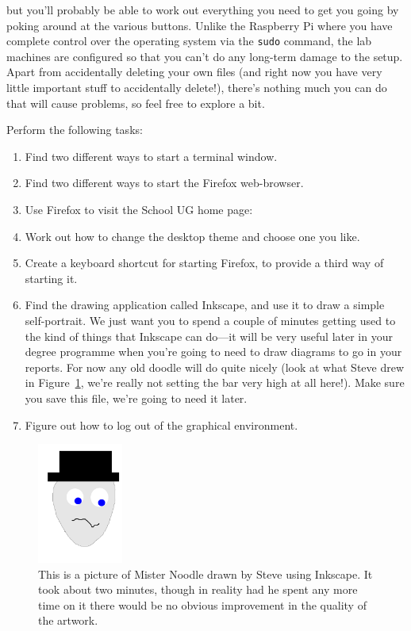 \noindent but you'll probably be able to work out everything you need to get you going by poking around at the various buttons. Unlike the Raspberry Pi where you have complete control over the operating system via the \texttt{sudo} command, the lab machines are configured so that you can't do any long-term damage to the setup. Apart from accidentally deleting your own files (and right now you have very little important stuff to accidentally delete!), there's nothing much you can do that will cause problems, so feel free to explore a bit.

Perform the following tasks:
\begin{enumerate}
\item Find two different ways to start a terminal window.
\item Find two different ways to start the Firefox web-browser.
\item Use Firefox to visit the School UG home page:
\item Work out how to change the desktop theme and choose one you like.
\item Create a keyboard shortcut for starting Firefox, to provide a third way of starting it.
\item Find the  drawing application called Inkscape, and use it to draw a simple self-portrait. We just want you to spend a couple of minutes getting used to the kind of things that Inkscape can do---it will be very useful later in your degree programme when you're going to need to draw diagrams to go in your reports. For now any old doodle will do quite nicely (look at what Steve drew in Figure~\ref{figure:mrnoodle}, we're really not setting the bar very high at all here!). Make sure you save this file, we're going to need it later.
\item Figure out how to log out of the graphical environment. \label{list:logout}
\end{enumerate}

\begin{figure}[t]
\centerline{\includegraphics[width=0.25\textwidth]{images/mrnoodle}}
\caption{This is a picture of Mister Noodle drawn by Steve using Inkscape. It took about two minutes, though in reality had he spent any more time on it there would be no obvious improvement in the quality of the artwork.}\label{figure:mrnoodle}
\end{figure}

